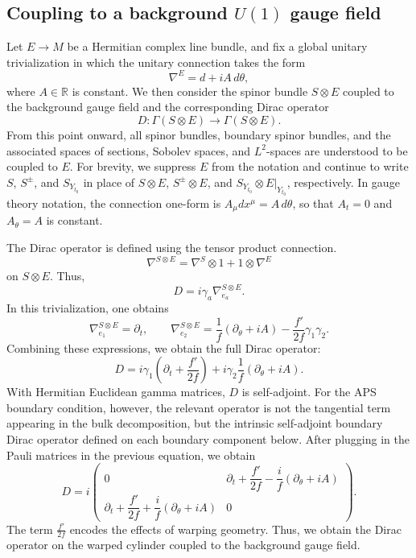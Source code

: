 \documentclass[11pt]{article}
\theoremstyle{definition}
\numberwithin{equation}{section}
\begin{document}
\subsection{Coupling to a background \(U(1)\) gauge field}\label{subsec:gaugetw}
Let \(E\to M\) be a Hermitian complex line bundle, and fix a global unitary trivialization in which the unitary connection takes the form
\begin{equation}
\nabla^E=d+iA\,d\theta,
\end{equation}
where \(A\in\mathbb R\) is constant. We then consider the spinor bundle \(S\otimes E\) coupled to the background gauge field and the corresponding Dirac operator
\begin{equation}
D:\Gamma(S\otimes E)\to \Gamma(S\otimes E).
\end{equation}
From this point onward, all spinor bundles, boundary spinor bundles, and the associated spaces of sections, Sobolev spaces, and \(L^2\)-spaces are understood to be coupled to \(E\). For brevity, we suppress \(E\) from the notation and continue to write \(S\), \(S^\pm\), and \(S_{Y_{t_0}}\) in place of \(S\otimes E\), \(S^\pm\otimes E\), and \(S_{Y_{t_0}}\otimes E|_{Y_{t_0}}\), respectively.
In gauge theory notation, the connection one-form is $ A_\mu dx^\mu = A\,d\theta$, so that $A_t=0$ and $A_{\theta}=A$ is constant. 

The Dirac operator is defined using the tensor product connection.
\begin{equation}
\nabla^{S\otimes E}=\nabla^S\otimes 1 + 1\otimes \nabla^E
\end{equation}
on $S\otimes E$. Thus,
\begin{equation}
D = i\gamma_a \nabla^{S\otimes E}_{e_a}.
\end{equation}
In this trivialization, one obtains
\begin{equation}
\nabla^{S\otimes E}_{e_1}=\partial_t,\qquad
\nabla^{S\otimes E}_{e_2}=\frac1{f}(\partial_\theta+iA)-\frac{f'}{2f}\gamma_1\gamma_2.
\end{equation}
%
Combining these expressions, we obtain the full Dirac operator:
\begin{equation}
D = i \gamma_1 \left( \partial_t + \frac{f'}{2 f} \right) + i \gamma_2 \frac{1}{f} (\partial_{\theta} + iA).
\end{equation}
With Hermitian Euclidean gamma matrices, \(D\) is self-adjoint. For the APS boundary condition, however, the relevant operator is not the tangential term appearing in the bulk decomposition, but the intrinsic self-adjoint boundary Dirac operator defined on each boundary component below.
After plugging in the Pauli matrices in the previous equation, we obtain 
\begin{equation} \label{eq:Diracop}
D = 
i \begin{pmatrix}
0 & \partial_t + \dfrac{f'}{2f} - \dfrac{i}{f}( \partial_{\theta} + i A) \\
\partial_t + \dfrac{f'}{2f} + \dfrac{i}{f} ( \partial_{\theta} + i A)& 0
\end{pmatrix}.
\end{equation} 
The term $\frac{f'}{2f}$ encodes the effects of warping geometry. 
Thus, we obtain the Dirac operator on the warped cylinder coupled to the background gauge field.
\end{document}
